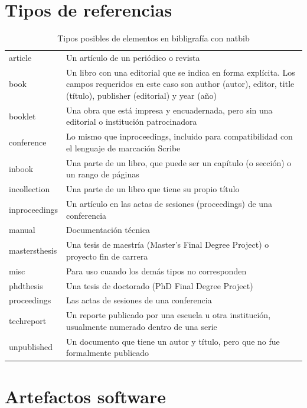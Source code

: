   \chapter{Tipos de referencias}
  \label{sec:bib}
    \begin{table} 
	\begin{center}
	\begin{tabular}{l p{10cm} }
	 \hline
   article& Un artículo de un periódico o revista\\
  
    book& Un libro con una editorial que se indica en forma explícita. Los campos requeridos en este caso son author (autor), editor, title (título), publisher (editorial) y year (año)\\
  
    booklet& Una obra que está impresa y encuadernada, pero sin una editorial o institución patrocinadora\\
  
    conference& Lo mismo que inproceedings, incluido para compatibilidad con el lenguaje de marcación Scribe\\
  
    inbook& Una parte de un libro, que puede ser un capítulo (o sección) o un rango de páginas\\
  
    incollection& Una parte de un libro que tiene su propio título\\
  
    inproceedings& Un artículo en las actas de sesiones (proceedings) de una conferencia\\
  
    manual& Documentación técnica\\
  
    mastersthesis& Una tesis de maestría (Master's Final Degree Project) o proyecto fin de carrera\\
  
    misc& Para uso cuando los demás tipos no corresponden\\
  
    phdthesis& Una tesis de doctorado (PhD Final Degree Project)\\
  
    proceedings& Las actas de sesiones de una conferencia\\
  
    techreport& Un reporte publicado por una escuela u otra institución, usualmente numerado dentro de una serie\\
  
    unpublished& Un documento que tiene un autor y título, pero que no fue formalmente publicado\\
          \hline
	\end{tabular}
	\end{center}
	\caption{Tipos posibles de elementos en bibligrafía con natbib}
\end{table}

 
  \chapter *{Artefactos software}



